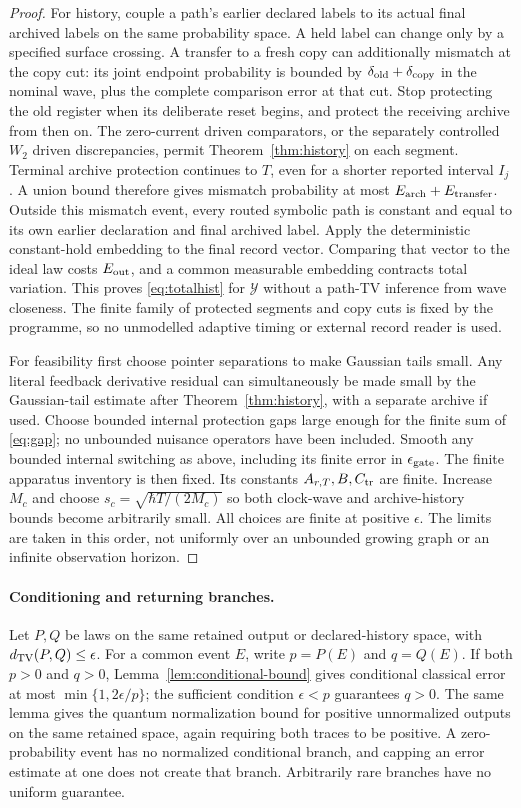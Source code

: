 \documentclass[11pt]{article}
\theoremstyle{definition}\newtheorem{assumption}[theorem]{Constitutive assumption}
\theoremstyle{remark}\newtheorem{remark}[theorem]{Remark}
\begin{document}
\begin{proof}
For history, couple a path's earlier declared labels to its actual final archived labels on the same probability space. A held label can change only by a specified surface crossing. A transfer to a fresh copy can additionally mismatch at the copy cut: its joint endpoint probability is bounded by $\delta_{\rm old}+\delta_{\rm copy}$ in the nominal wave, plus the complete comparison error at that cut. Stop protecting the old register when its deliberate reset begins, and protect the receiving archive from then on. The zero-current driven comparators, or the separately controlled $W_2$ driven discrepancies, permit Theorem~\ref{thm:history} on each segment. Terminal archive protection continues to $T$, even for a shorter reported interval $I_j$. A union bound therefore gives mismatch probability at most $E_{\rm arch}+E_{\rm transfer}$. Outside this mismatch event, every routed symbolic path is constant and equal to its own earlier declaration and final archived label. Apply the deterministic constant-hold embedding to the final record vector. Comparing that vector to the ideal law costs $E_{\rm out}$, and a common measurable embedding contracts total variation. This proves \eqref{eq:totalhist} for $\mathcal Y$ without a path-TV inference from wave closeness. The finite family of protected segments and copy cuts is fixed by the programme, so no unmodelled adaptive timing or external record reader is used.

For feasibility first choose pointer separations to make Gaussian tails small. Any literal feedback derivative residual can simultaneously be made small by the Gaussian-tail estimate after Theorem~\ref{thm:history}, with a separate archive if used. Choose bounded internal protection gaps large enough for the finite sum of \eqref{eq:gap}; no unbounded nuisance operators have been included. Smooth any bounded internal switching as above, including its finite error in $\epsilon_{\rm gate}$. The finite apparatus inventory is then fixed. Its constants $A_{r,T},B,C_{\rm tr}$ are finite. Increase $M_c$ and choose $s_c=\sqrt{\hbar T/(2M_c)}$ so both clock-wave and archive-history bounds become arbitrarily small. All choices are finite at positive $\epsilon$. The limits are taken in this order, not uniformly over an unbounded growing graph or an infinite observation horizon.
\end{proof}

\paragraph{Conditioning and returning branches.}
Let $P,Q$ be laws on the same retained output or declared-history space, with $d_{\rm TV}(P,Q)\le\epsilon$. For a common event $E$, write $p=P(E)$ and $q=Q(E)$. If both $p>0$ and $q>0$, Lemma~\ref{lem:conditional-bound} gives conditional classical error at most $\min\{1,2\epsilon/p\}$; the sufficient condition $\epsilon<p$ guarantees $q>0$. The same lemma gives the quantum normalization bound for positive unnormalized outputs on the same retained space, again requiring both traces to be positive. A zero-probability event has no normalized conditional branch, and capping an error estimate at one does not create that branch. Arbitrarily rare branches have no uniform guarantee.
\end{document}
